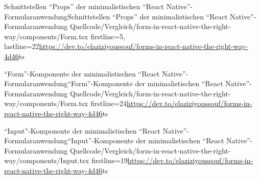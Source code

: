 \begin{fremdeslisting}{Schnittstellen \enquote{Props} der minimalistischen \enquote{React Native}-Formularanwendung}{Schnittstellen \enquote{Props} der minimalistischen \enquote{React Native}-Formularanwendung}
  {Quellcode/Vergleich/form-in-react-native-the-right-way/components/Form.tsx}
  {firstline=5, lastline=22}{\url{https://dev.to/elaziziyoussouf/forms-in-react-native-the-right-way-4d46}}{ts}
  \label{lst:VergleichReactNatveForm}
\end{fremdeslisting}

\begin{fremdeslisting}{\enquote{Form}-Komponente der minimalistischen \enquote{React Native}-Formularanwendung}{\enquote{Form}-Komponente der minimalistischen \enquote{React Native}-Formularanwendung}
	{Quellcode/Vergleich/form-in-react-native-the-right-way/components/Form.tsx}
	{firstline=24}{\url{https://dev.to/elaziziyoussouf/forms-in-react-native-the-right-way-4d46}}{ts}
	\label{lst:VergleichReactNatveForm2}
\end{fremdeslisting}

\begin{fremdeslisting}{\enquote{Input}-Komponente der minimalistischen \enquote{React Native}-Formularanwendung}{\enquote{Input}-Komponente der minimalistischen \enquote{React Native}-Formularanwendung}
  {Quellcode/Vergleich/form-in-react-native-the-right-way/components/Input.tsx}
  {firstline=19}{\url{https://dev.to/elaziziyoussouf/forms-in-react-native-the-right-way-4d46}}{ts}
  \label{lst:VergleichReactNatveInput}
\end{fremdeslisting} 
